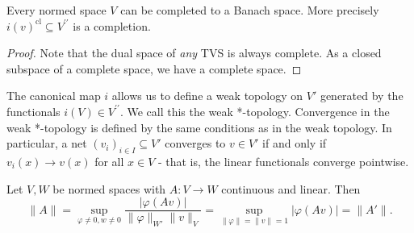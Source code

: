 \documentclass[twoside,symmetric, openany, 12pt]{./tuftebook}
\theoremstyle{definition}
\theoremstyle{definition}
\theoremstyle{definition}
\begin{document}
\begin{Theorem}
	Every normed space $V$ can be completed to a Banach space. More precisely $i(v)^\text{cl}\subseteq V^{\prime\prime}$ is a completion.
\end{Theorem}
\begin{proof}
	Note that the dual space of \emph{any} TVS is always complete. As a closed subspace of a complete space, we have a complete space.
\end{proof}
The canonical map $i$ allows us to define a weak topology on $V'$ generated by the functionals $i(V)\in V^{\prime\prime}$. We call this the weak *-topology. Convergence in the weak *-topology is defined by the same conditions as in the weak topology. In particular, a net $(v_i)_{i\in I}\subseteq V'$ converges to $v\in V'$ if and only if $v_i(x)\to v(x)$ for all $x\in V$ - that is, the linear functionals converge pointwise.
\begin{Theorem}
	Let $V,W$ be normed spaces with $A:V \to W$ continuous and linear. Then
	\[
		\|A\|= \sup_{\varphi\neq 0, w \neq 0}\frac{|\varphi(A v)|}{\|\varphi\|_{W'}\|v\|_V}=\sup_{\|\varphi\|=\|v\|=1} |\varphi(A v)|=\|A'\|
	.\] 
\end{Theorem}
\end{document}
